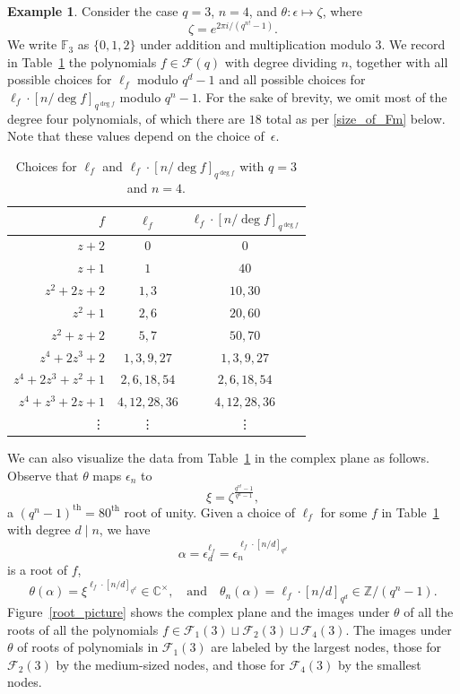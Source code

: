 \documentclass[10pt]{article}
\theoremstyle{definition}
\newtheorem{example}[theorem]{Example}
\newcommand{\Cbb}{\mathbb{C}}
\newcommand{\F}{\mathbb{F}}
\newcommand{\CF}{\mathcal{F}}
\newcommand{\Z}{\mathbb{Z}}
\newcommand{\eps}{\epsilon}
\newcommand{\te}{\theta}
\begin{document}
\begin{example}
Consider the case \(q = 3\), \(n = 4\), and \(\te : \eps \mapsto \zeta\), where
\[\zeta = e^{2 \pi i / (q^{n!}-1)}.\]
We write \(\F_3\) as \(\{0,1,2\}\) under addition and multiplication modulo \(3\).
We record in Table~\ref{root_table} the polynomials \(f \in \CF (q)\) with degree dividing \(n\), together with all possible choices for \(\ell_f\) modulo \(q^d-1\) and all possible choices for \(\ell_f \cdot [n / \deg f]_{q^{\deg f}}\) modulo \(q^n-1\).
For the sake of brevity, we omit most of the degree four polynomials, of which there are \(18\) total as per \eqref{size_of_Fm} below.
Note that these values depend on the choice of~\(\eps\).
\begin{table}[ht]
\caption{Choices for \(\ell_f\) and \(\ell_f \cdot [n/\deg f]_{q^{\deg f}}\) with \(q = 3\) and \(n = 4\).}
\centering
\begin{tabular}{r|c|c}
\(f\) & \(\ell_f\) & \(\ell_f \cdot [n/\deg f]_{q^{\deg f}}\) \\ \hline \hline
\(z + 2\) &                  \( 0 \) & \(0\) \\
\(z + 1\) &                  \( 1 \) & \(40\) \\
\hline
\(z^2 + 2z + 2\) &           \( 1, 3 \) & \( 10, 30 \) \\
\(z^2 + 1\) &                \( 2, 6 \) & \( 20, 60 \) \\
\(z^2 + z + 2\) &            \( 5, 7 \) & \( 50, 70 \) \\
\hline
\(z^4 + 2z^3 + 2\) &         \( 1,  3,  9, 27 \) & \( 1,  3,  9, 27 \) \\
\(z^4 + 2z^3 + z^2 + 1\) &   \( 2,  6, 18, 54 \) & \( 2,  6, 18, 54 \) \\
\(z^4 + z^3 + 2z + 1\) &     \( 4, 12, 28, 36 \) & \( 4, 12, 28, 36 \) \\
\vdots & \vdots & \vdots
\end{tabular}
\label{root_table}
\end{table}

We can also visualize the data from Table~\ref{root_table} in the complex plane as follows.
Observe that \(\te\) maps \(\eps_n\) to
\[
\xi = \zeta^{\frac{q^{n!}-1}{q^n-1}},
\]
a \((q^n-1)^\text{th} = 80^\text{th}\) root of unity.
Given a choice of \(\ell_f\) for some \(f\) in Table~\ref{root_table} with degree \(d \mid n\), we have
\[
\alpha
=
\eps_d^{\ell_f}
=
\eps_n^{\ell_f \cdot [n/d]_{q^d}}
\]
is a root of \(f\),
\[
\te (\alpha) = \xi^{\ell_f \cdot [n/d]_{q^d}} \in \Cbb^\times,
\quad
\text{and}
\quad
\te_n (\alpha) = \ell_f \cdot [n/d]_{q^d} \in \Z / (q^n-1).
\]
Figure~\ref{root_picture} shows the complex plane and the images under \(\te\) of all the roots of all the polynomials \(f \in \CF_1 (3) \sqcup \CF_2 (3) \sqcup \CF_4 (3)\).
The images under \(\te\) of roots of polynomials in \(\CF_1 (3)\) are labeled by the largest nodes, those for \(\CF_2 (3)\) by the medium-sized nodes, and those for \(\CF_4 (3)\) by the smallest nodes.


\end{example}
\end{document}
